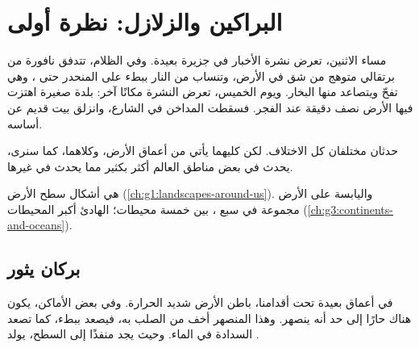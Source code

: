 \chapter{البراكين والزلازل: نظرة أولى}\label{ch:g4:volcanoes-earthquakes-first-look}

مساء الاثنين، تعرض نشرة الأخبار  في جزيرة بعيدة. وفي الظلام،
تتدفق نافورة من  برتقالي متوهج من شق في الأرض، وتنساب  من النار
ببطء على المنحدر حتى ، وهي تفحّ ويتصاعد منها البخار. ويوم الخميس،
تعرض النشرة مكانًا آخر: بلدة صغيرة اهتزت فيها الأرض نصف دقيقة عند الفجر.
فسقطت المداخن في الشارع، وانزلق بيت قديم عن
أساسه.

حدثان مختلفان كل الاختلاف. لكن كليهما يأتي من أعماق الأرض، وكلاهما، كما
سنرى، يحدث في بعض مناطق العالم أكثر بكثير مما يحدث في
غيرها.

\begin{recall}
    هي أشكال سطح الأرض
(\cref{ch:g1:landscapes-around-us}). واليابسة على الأرض مجموعة في سبع
، بين خمسة محيطات؛  الهادئ أكبر المحيطات
(\cref{ch:g3:continents-and-oceans}).
\end{recall}

\section{بركان يثور}

في أعماق بعيدة تحت أقدامنا، باطن الأرض شديد الحرارة. وفي بعض الأماكن، يكون
 هناك حارًا إلى حد أنه ينصهر. وهذا  المنصهر أخف من  الصلب
 به، فيصعد ببطء، كما تصعد السدادة في الماء. وحيث يجد منفذًا إلى
السطح، يولد .

